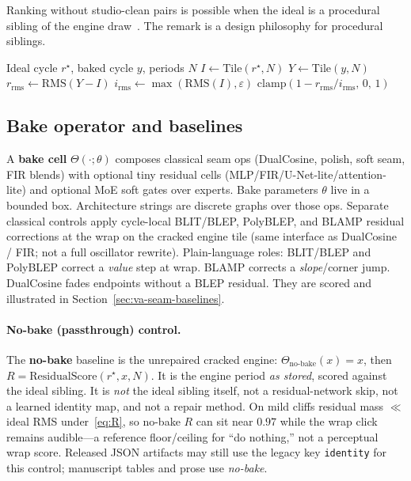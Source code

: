 \begin{remark}
\label{rem:n2n}
Ranking without studio-clean pairs is possible when the ideal is a procedural sibling of the engine draw~\cite{lehtinen2018,kashyap2021n2n}.
The remark is a design philosophy for procedural siblings.
\end{remark}

\begin{algorithm}[t]
\caption{ResidualScore}
\label{alg:residual}
\begin{algorithmic}[1]
\Require Ideal cycle $r^{\star}$, baked cycle $y$, periods $N$
\State $I \gets \mathrm{Tile}(r^{\star}, N)$
\State $Y \gets \mathrm{Tile}(y, N)$
\State $r_{\mathrm{rms}} \gets \mathrm{RMS}(Y-I)$
\State $i_{\mathrm{rms}} \gets \max(\mathrm{RMS}(I), \varepsilon)$
\State \Return $\mathrm{clamp}(1 - r_{\mathrm{rms}}/i_{\mathrm{rms}},\,0,\,1)$
\end{algorithmic}
\end{algorithm}

\subsection{Bake operator and baselines}
\label{sec:bake}

A \textbf{bake cell} $\Theta(\cdot;\theta)$ composes classical seam ops (DualCosine, polish, soft seam, FIR blends) with optional tiny residual cells (MLP/FIR/U-Net-lite/attention-lite) and optional MoE soft gates over experts.
Bake parameters $\theta$ live in a bounded box. Architecture strings are discrete graphs over those ops.
Separate classical controls apply cycle-local BLIT/BLEP, PolyBLEP, and BLAMP residual corrections at the wrap on the cracked engine tile (same interface as DualCosine / FIR; not a full oscillator rewrite).
Plain-language roles: BLIT/BLEP and PolyBLEP correct a \emph{value} step at wrap.
BLAMP corrects a \emph{slope}/corner jump.
DualCosine fades endpoints without a BLEP residual.
They are scored and illustrated in Section~\ref{sec:va-seam-baselines}.

\paragraph{No-bake (passthrough) control.}
\label{sec:no-bake}
The \textbf{no-bake} baseline is the unrepaired cracked engine: $\Theta_{\mathrm{no\text{-}bake}}(x)=x$, then $R=\mathrm{ResidualScore}(r^{\star},x,N)$.
It is the engine period \emph{as stored}, scored against the ideal sibling.
It is \emph{not} the ideal sibling itself, not a residual-network skip, not a learned identity map, and not a repair method.
On mild cliffs residual mass $\ll$ ideal RMS under~\eqref{eq:R}, so no-bake $R$ can sit near $0.97$ while the wrap click remains audible---a reference floor/ceiling for ``do nothing,'' not a perceptual wrap score.
Released JSON artifacts may still use the legacy key \texttt{identity} for this control; manuscript tables and prose use \emph{no-bake}.


